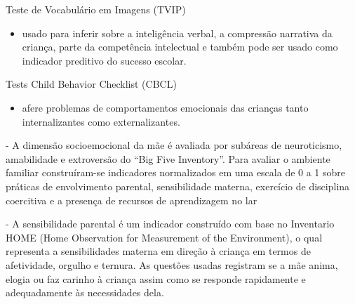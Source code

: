 \documentclass[10pt]{Beamer}
\begin{document}
\begin{frame}

\begin{block}{Teste de Vocabulário em Imagens (TVIP)}
\begin{itemize}
\item usado para inferir sobre a inteligência  verbal, a compressão narrativa da criança, parte da competência intelectual e também pode ser usado como indicador preditivo do sucesso escolar. 
\end{itemize}
\end{block}

\begin{block}{Tests Child Behavior Checklist (CBCL)}
\begin{itemize}
\item afere problemas de comportamentos emocionais das crianças tanto internalizantes como externalizantes.
\end{itemize}
\end{block}

\end{frame}

\begin{frame}



\begin{tcolorbox}[drop fuzzy shadow=ShadowColor]
- A dimensão socioemocional da mãe é avaliada por subáreas de neuroticismo, amabilidade e extroversão  do “Big Five Inventory”. Para avaliar o ambiente familiar construíram-se indicadores normalizados em uma escala de 0 a 1 sobre práticas de envolvimento parental, sensibilidade materna, exercício de disciplina coercitiva e a presença de recursos de aprendizagem no lar

\vskip0.5cm

- A sensibilidade parental é um indicador construído com base no Inventario HOME (Home
Observation for Measurement of the Environment), o qual representa a sensibilidades materna em direção à criança em termos de afetividade, orgulho e ternura. As questões usadas registram se a mãe anima, elogia ou faz carinho à criança assim como se responde rapidamente e adequadamente às necessidades dela.
\end{tcolorbox}


\end{frame}
\end{document}
